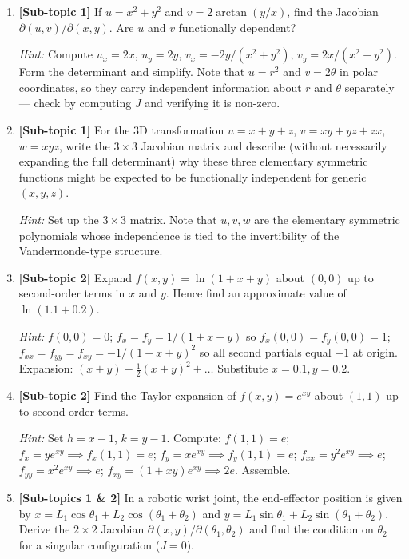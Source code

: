 \documentclass[12pt,a4paper]{article}
\begin{document}
\begin{enumerate}[leftmargin=*, label=\textbf{D\arabic*.}]

  \item \textbf{[Sub-topic 1]} If \( u = x^{2} + y^{2} \) and \( v = 2\arctan(y/x) \), find the Jacobian \( \partial(u,v)/\partial(x,y) \). Are \( u \) and \( v \) functionally dependent?

  \textit{Hint:} Compute \( u_x = 2x \), \( u_y = 2y \), \( v_x = -2y/(x^2+y^2) \), \( v_y = 2x/(x^2+y^2) \). Form the determinant and simplify. Note that \( u = r^{2} \) and \( v = 2\theta \) in polar coordinates, so they carry independent information about \( r \) and \( \theta \) separately --- check by computing \( J \) and verifying it is non-zero.

  \item \textbf{[Sub-topic 1]} For the 3D transformation \( u = x+y+z \), \( v = xy+yz+zx \), \( w = xyz \), write the \( 3\times 3 \) Jacobian matrix and describe (without necessarily expanding the full determinant) why these three elementary symmetric functions might be expected to be functionally independent for generic \( (x,y,z) \).

  \textit{Hint:} Set up the \( 3\times 3 \) matrix. Note that \( u, v, w \) are the elementary symmetric polynomials whose independence is tied to the invertibility of the Vandermonde-type structure.

  \item \textbf{[Sub-topic 2]} Expand \( f(x,y) = \ln(1+x+y) \) about \( (0,0) \) up to second-order terms in \( x \) and \( y \). Hence find an approximate value of \( \ln(1.1 + 0.2) \).

  \textit{Hint:} \( f(0,0)=0 \); \( f_x = f_y = 1/(1+x+y) \) so \( f_x(0,0) = f_y(0,0) = 1 \); \( f_{xx} = f_{yy} = f_{xy} = -1/(1+x+y)^{2} \) so all second partials equal \( -1 \) at origin. Expansion: \( (x+y) - \tfrac{1}{2}(x+y)^{2} + \ldots \) Substitute \( x=0.1, y=0.2 \).

  \item \textbf{[Sub-topic 2]} Find the Taylor expansion of \( f(x,y) = e^{xy} \) about \( (1,1) \) up to second-order terms.

  \textit{Hint:} Set \( h = x-1 \), \( k = y-1 \). Compute: \( f(1,1) = e \); \( f_x = ye^{xy} \implies f_x(1,1) = e \); \( f_y = xe^{xy} \implies f_y(1,1) = e \); \( f_{xx} = y^2 e^{xy} \implies e \); \( f_{yy} = x^2 e^{xy} \implies e \); \( f_{xy} = (1+xy)e^{xy} \implies 2e \). Assemble.

  \item \textbf{[Sub-topics 1 \& 2]} In a robotic wrist joint, the end-effector position is given by \( x = L_1\cos\theta_1 + L_2\cos(\theta_1+\theta_2) \) and \( y = L_1\sin\theta_1 + L_2\sin(\theta_1+\theta_2) \). Derive the \( 2\times 2 \) Jacobian \( \partial(x,y)/\partial(\theta_1,\theta_2) \) and find the condition on \( \theta_2 \) for a singular configuration (\( J = 0 \)).


\end{enumerate}
\end{document}
